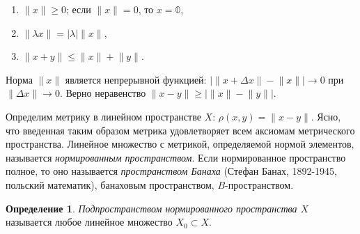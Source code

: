 \documentclass[12pt,a4paper,titlepage,oneside]{book}
\theoremstyle{definition}
\newtheorem*{definition}{Определение}
\theoremstyle{plain}
\theoremstyle{break}
\theoremstyle{remark}
\theoremstyle{remark}
\theoremstyle{remark}
\theoremstyle{remark}
\theoremstyle{plain}
\theoremstyle{plain}
\begin{document}
\begin{enumerate}

	\item $\lVert x\rVert \geqslant 0$; если $\lVert x\rVert = 0$, то $x=\mathbb{0}$,

	\item $\lVert \lambda x \rVert = \lvert \lambda \rvert \lVert x \rVert$,

	\item $\lVert x+y \rVert \leqslant \lVert x \rVert + \lVert y \rVert$.

\end{enumerate}

Норма $\lVert x\rVert$ является непрерывной функцией: $\big\lvert \lVert x + \Delta x \rVert - \lVert x\rVert \big\rvert \to 0$ при $\lVert \Delta x \rVert \to0$.
Верно неравенство $\lVert x-y \rVert \geqslant \big\lvert \lVert x \rVert-\lVert y \rVert \big\rvert$.

Определим метрику в линейном пространстве $X$: $\rho(x,y)=\lVert x-y\rVert$. Ясно, что введенная таким образом метрика удовлетворяет всем аксиомам метрического пространства. Линейное множество с метрикой, определяемой нормой элементов, называется \textit{нормированным пространством}. Если нормированное пространство полное, то оно называется \textit{пространством Банаха} (Стефан Банах, 1892-1945, польский математик), банаховым пространством, $B$-пространством.

\begin{definition}
\textit{Подпространством нормированного пространства $X$} называется любое линейное  множество $X_0 \subset X$.
\end{definition}
\end{document}

